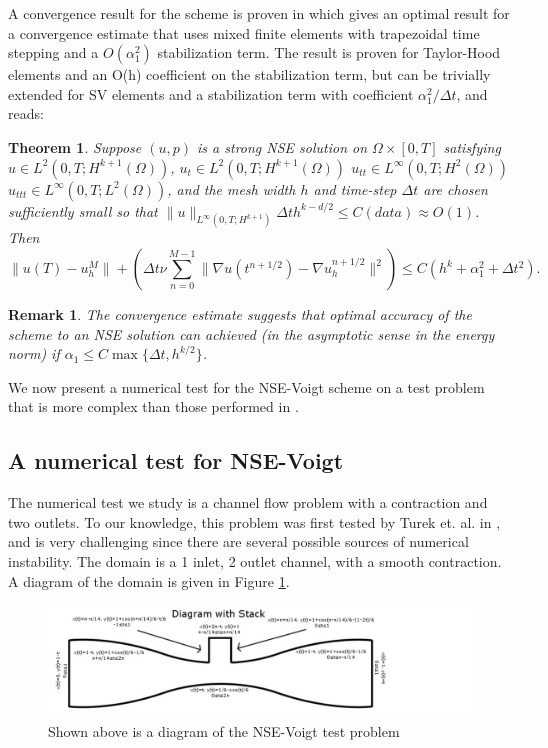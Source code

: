 \documentclass[11pt]{article}%
\numberwithin{equation}{section}
\newtheorem{theorem}{Theorem}[section]
\newtheorem{remark}{Remark}[section]
\begin{document}
A convergence result for the scheme is proven in \cite{LLMNR09} which gives an optimal result for a convergence estimate that uses mixed finite elements with trapezoidal time stepping and a $O(\alpha_1^2)$ stabilization term.  The result is proven for Taylor-Hood elements and an O(h) coefficient on the stabilization term, but can be trivially extended for SV elements and a stabilization term with coefficient $\alpha_1^2 / \Delta t$, and reads:
\begin{theorem}
Suppose $(u,p)$ is a strong NSE solution on $\Omega \times [0,T]$ satisfying
$u \in L^{2}(0,T;H^{k+1}(\Omega))$,
$u_{t} \in L^{2}(0,T;H^{k+1}(\Omega))$
$u_{tt} \in L^{\infty}(0,T;H^2(\Omega))$
$u_{ttt} \in L^{\infty}(0,T;L^2(\Omega))$, and the mesh width $h$ and time-step $\Delta t$ are chosen sufficiently small
so that $\| u \|_{L^{\infty}(0,T;H^{k+1})} \Delta t h^{k-d/2} \le C(data) \approx O(1)$.  Then
\[
\| u(T) - u_h^M \| + \left( \Delta t \nu \sum_{n=0}^{M-1} \| \nabla u(t^{n+1/2}) - \nabla u_h^{n+1/2} \|^2 \right) \le C\left( h^k + \alpha_1^2 + \Delta t^2 \right).
\]
\end{theorem}
\begin{remark}
The convergence estimate suggests that optimal accuracy of the scheme to an NSE solution can achieved (in the asymptotic sense in the energy norm) if $\alpha_1 \le C\max{ \{ \Delta t, h^{k/2} \} }$.  
\end{remark}

We now present  a numerical test for the NSE-Voigt scheme on a test problem that is more complex than those performed in \cite{LLMNR09}.

\subsection{A numerical test for NSE-Voigt}

The numerical test we study is a channel flow problem with a contraction and two outlets.  To our knowledge, this problem was
first tested by Turek et. al. in \cite{HRT96}, and is very challenging since there are several possible sources of numerical instability.  The domain is a 1 inlet, 2 outlet channel, with a smooth contraction.  A diagram of the domain is given in Figure \ref{diagram}.

\begin{figure}[h!]
\begin{center}
\includegraphics[width=1\textwidth,height=0.4\textwidth, viewport=0 0 900 300, clip]{diagram.pdf} 
\end{center}
\caption{\label{diagram}
Shown above is a diagram of the NSE-Voigt test problem}
\end{figure}
\end{document}
